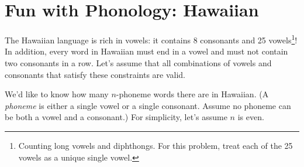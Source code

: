 \documentclass[12pt]{article}
\begin{document}


\newpage
\section{Fun with Phonology: Hawaiian}


The Hawaiian language is rich in vowels: it contains
 8 consonants and 25 vowels\footnote{Counting long vowels 
and diphthongs. For this problem, treat each of the 25 vowels as
 a unique single vowel.}! In addition, every word in Hawaiian
 must end in a vowel and must not contain two consonants
 in a row. Let's assume that all combinations of vowels
and consonants that satisfy these constraints are valid.

We'd like to know how many $n$-phoneme words there are in Hawaiian. 
(A \emph{phoneme} is either a single vowel or
a single consonant. Assume no phoneme can be both a vowel and a consonant.) For simplicity, let's assume $n$ is even.
\end{document}
